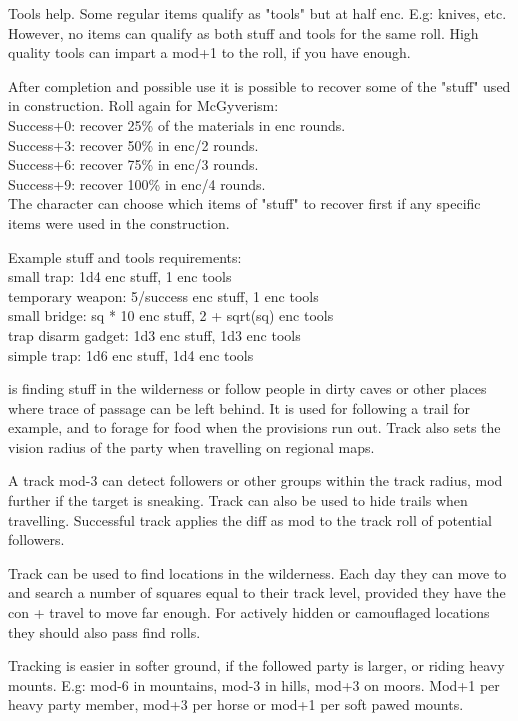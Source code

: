 Tools help. Some regular items qualify as "tools" but at half enc. E.g: knives, etc. However, no items can qualify as both stuff and tools for the same roll. High quality tools can impart a mod+1 to the roll, if you have enough.

After completion and possible use it is possible to recover some of the "stuff" used in construction. Roll again for McGyverism: \\
Success+0: recover 25\% of the materials in enc rounds. \\
Success+3: recover 50\% in enc/2 rounds. \\
Success+6: recover 75\% in enc/3 rounds. \\
Success+9: recover 100\% in enc/4 rounds. \\
The character can choose which items of "stuff" to recover first if any specific items were used in the construction.

Example stuff and tools requirements: \\
small trap: 1d4 enc stuff, 1 enc tools \\
temporary weapon: 5/success enc stuff, 1 enc tools \\
small bridge: sq * 10 enc stuff, 2 + sqrt(sq) enc tools \\
trap disarm gadget: 1d3 enc stuff, 1d3 enc tools \\
simple trap: 1d6 enc stuff, 1d4 enc tools


 is finding stuff in the wilderness or follow people in dirty caves or other places where trace of passage can be left behind. It is used for following a trail for example, and to forage for food when the provisions run out. Track also sets the vision radius of the party when travelling on regional maps.

A track mod-3 can detect followers or other groups within the track radius, mod further if the target is sneaking.
Track can also be used to hide trails when travelling. Successful track applies the diff as mod to the track roll of potential followers.

Track can be used to find locations in the wilderness. Each day they can move to and search a number of squares equal to their track level, provided they have the con + travel to move far enough. For actively hidden or camouflaged locations they should also pass find rolls.

Tracking is easier in softer ground, if the followed party is larger, or riding heavy mounts. E.g: mod-6 in mountains, mod-3 in hills, mod+3 on moors. Mod+1 per heavy party member, mod+3 per horse or mod+1 per soft pawed mounts.

